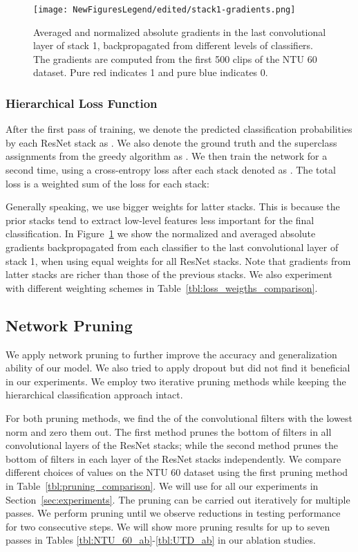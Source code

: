 \documentclass{article}
\begin{document}
\begin{figure}[tbh]
\centering
\texttt{[image: NewFiguresLegend/edited/stack1-gradients.png]}
\caption{Averaged and normalized absolute gradients in the last convolutional layer of stack 1, backpropagated from different levels of classifiers. The gradients are computed from the first 500 clips of the NTU 60 dataset. Pure red indicates 1 and pure blue indicates 0.}
\label{fig:level-1gradients}
\end{figure}

\subsubsection{Hierarchical Loss Function}
{After the first pass of training, we denote the predicted classification probabilities by each ResNet stack as . We also denote the ground truth and the superclass assignments from the greedy algorithm as . We then train the network for a second time, using a cross-entropy loss after each stack denoted as . The total loss is a weighted sum of the loss for each stack:

Generally speaking, we use bigger weights  for latter stacks. This is because the prior stacks tend to extract low-level features less important for the final classification. In Figure~\ref{fig:level-1gradients} we show the normalized and averaged absolute gradients backpropagated from each classifier to the last convolutional layer of stack 1, when using equal weights  for all ResNet stacks. Note that gradients from latter stacks are richer than those of the previous stacks. We also experiment with different weighting schemes in Table~\ref{tbl:loss_weigths_comparison}.}

\subsection{Network Pruning}
\label{sec:prunning}

{We apply network pruning to further improve the accuracy and generalization ability of our model. We also tried to apply dropout but did not find it beneficial in our experiments. We employ two iterative pruning methods while keeping the hierarchical classification approach intact. } 

{For both pruning methods, we find the  of the convolutional filters with the lowest  norm and zero them out. The first method prunes the bottom  of filters in all convolutional layers of the ResNet stacks; while the second method prunes the bottom  of filters in each layer of the ResNet stacks independently. We compare different choices of  values on the NTU 60 dataset using the first pruning method in Table~\ref{tbl:pruning_comparison}. We will use  for all our experiments in Section~\ref{sec:experiments}. The pruning can be carried out iteratively for multiple passes. We perform pruning until we observe reductions in testing performance for two consecutive steps. We will show more pruning results for up to seven passes in Tables \ref{tbl:NTU_60_ab}-\ref{tbl:UTD_ab} in our ablation studies.}
\end{document}
